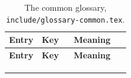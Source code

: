 \makeatletter
\newcommand*{\tdk@abbrrows}{}\newcommand*{\tdk@symrows}{}\newcommand*{\tdk@termrows}{}
\newcommand{\tdk@abbrrow}[1]{\Glsentrylong{#1} (\glsentryshort{#1}) & \texttt{#1} & \glsentryuseri{#1}. \\}
\newcommand{\tdk@symrow}[1]{\glsentryname{#1} & \texttt{#1} & \glsentrydesc{#1}. \\}
\newcommand{\tdk@termrow}[1]{\Glsentryname{#1} & \texttt{#1} & \glsentrydesc{#1}. \\}
\newcommand{\tdk@sortcommon}[1]{%
  \edef\tdk@type{\glsentrytype{#1}}%
  \ifdefstring{\tdk@type}{abbreviations}{\gappto\tdk@abbrrows{\tdk@abbrrow{#1}}}{%
    \ifdefstring{\tdk@type}{symbols}{\gappto\tdk@symrows{\tdk@symrow{#1}}}{\gappto\tdk@termrows{\tdk@termrow{#1}}}}}
\forlistloop{\tdk@sortcommon}{\tdkcommonkeys}
{\small
\begin{xltabular}{\linewidth}{>{\raggedright\arraybackslash}p{0.27\linewidth} l X}
  \caption{The common glossary, \texttt{include/glossary-common.tex}.}\label{guide:tab:glossary-common}\\
  \toprule \textbf{Entry} & \textbf{Key} & \textbf{Meaning} \\ \midrule \endfirsthead
  \toprule \textbf{Entry} & \textbf{Key} & \textbf{Meaning} \\ \midrule \endhead
  \bottomrule \endlastfoot
   \\
  \tdk@abbrrows \midrule
   \\
  \tdk@symrows \midrule
   \\
  \tdk@termrows
\end{xltabular}
}
\makeatother

